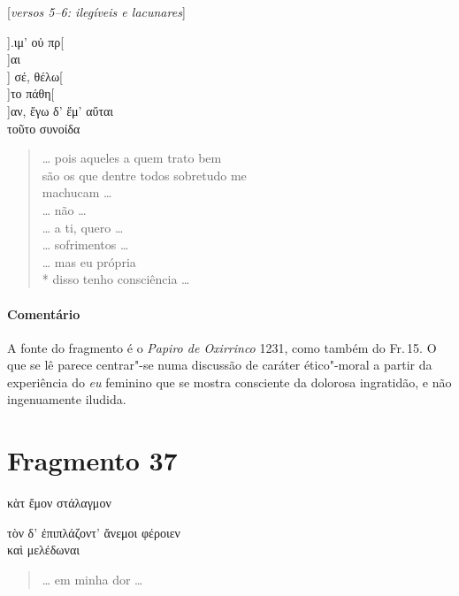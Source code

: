{\begin{gkverse}
\textnormal{[\textit{versos 5--6: ilegíveis e lacunares}]}

           ].ιμ’ οὐ πρ[\\
  ]αι\\
  ] σέ, θέλω[\\
  ]το πάθη[\\
         ]αν, ἔγω δ’ ἔμ’ αὔται\\
τοῦτο συνοίδα
\end{gkverse}

\begin{verse}
\ldots{} pois aqueles a quem trato bem\\
são os que dentre todos sobretudo me\\
machucam \ldots{}\\
\ldots{} não \ldots{}\\
\ldots{} a ti, quero \ldots{}\\
\ldots{} sofrimentos \ldots{}\\
\ldots{} mas eu própria\\*
disso tenho consciência \ldots{}
\end{verse}

\medskip

{\paragraph{Comentário} A fonte do fragmento é o \textit{Papiro de Oxirrinco} 1231, como também do Fr.\,15. O que se lê parece centrar"-se numa discussão de caráter ético"-moral
a partir da experiência do \textit{eu} feminino que se mostra consciente da dolorosa
ingratidão, e não ingenuamente iludida.}



\pagebreak
\section{Fragmento 37}

\begin{gkverse}
κὰτ ἔμον στάλαγμον

\hspace*{16mm}

τὸν δ’ ἐπιπλάζοντ’ ἄνεμοι φέροιεν\\
      καὶ μελέδωναι
\end{gkverse}

\begin{verse}
\ldots{} em minha dor \ldots{}

\hspace*{16mm}


\end{verse}}
